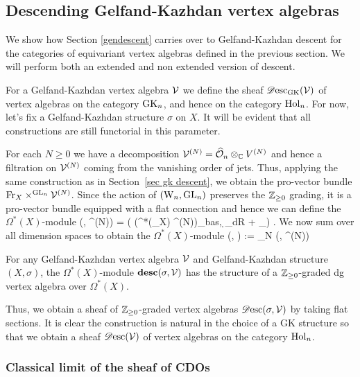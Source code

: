 \subsection{Descending Gelfand-Kazhdan vertex algebras} 

We show how Section \ref{gendescent} carries over to
Gelfand-Kazhdan descent for the categories of equivariant vertex
algebras defined in the previous section. We will perform both an
extended and non extended version of descent.

For a Gelfand-Kazhdan vertex algebra $\mathcal{V}$ we define the sheaf $\mathscr{D}{\rm esc}_{{\rm GK}} (\mathcal{V})$ of
vertex algebras on the category ${\rm GK}_n$, and hence on the category
${\rm Hol}_n$. For now, let's fix a Gelfand-Kazhdan structure $\sigma$ on $X$. It will be
evident that all constructions are still functorial in this parameter.  

For each $N \geq 0$ we have a decomposition $\mathcal{V}^{(N)} = \widehat{\mathcal O}_n
\otimes_\mathbb C V^{(N)}$ and hence a filtration on $\mathcal{V}^{(N)}$ coming
from the vanishing order of jets. Thus, applying the same
construction as in Section~\ref{sec gk descent}, 
we obtain the pro-vector
bundle ${\rm Fr}_X \times^{{\rm GL}_n} \mathcal{V}^{(N)}$. 
Since the action of $({{\rm W}_n},
{\rm GL}_n)$ preserves the $\mathbb Z_{\geq 0}$ grading, 
it is a pro-vector bundle equipped with a flat connection and hence we can define the
$\Omega^*(X)$-module 
\ben 
\bdesc(\sigma, \cV^{(N)}) = \left( \left(\Omega^*(\Fr_X) \tensor
    \cV^{(N)}\right)_{bas}, \d_{dR} + \omega_\sigma\right)  .
\een 
We now sum over all dimension spaces to obtain the $\Omega^*(X)$-module
\ben
\bdesc(\sigma, \cV) := \bigoplus_{N } \bdesc(\sigma, \cV^{(N)})
\een

\begin{lemma} 
For any Gelfand-Kazhdan vertex algebra $\mathcal{V}$ and Gelfand-Kazhdan structure
$(X,\sigma)$, the $\Omega^*(X)$-module $\mathbf{desc}(\sigma, \mathcal{V})$ has the
structure of a $\mathbb Z_{\geq 0}$-graded dg vertex algebra over
$\Omega^*(X)$. 
\end{lemma}

Thus, we obtain a sheaf of $\mathbb Z_{\geq 0}$-graded vertex algebras
$\mathscr{D}{\rm esc}(\sigma, \mathcal{V})$ by
taking flat sections. It is clear the construction is natural in the choice of a GK
structure so that we obtain a sheaf $\mathscr{D}{\rm esc}(\mathcal{V})$ of vertex algebras
on the category ${\rm Hol}_n$. 

\subsubsection{Classical limit of the sheaf of CDOs} 

